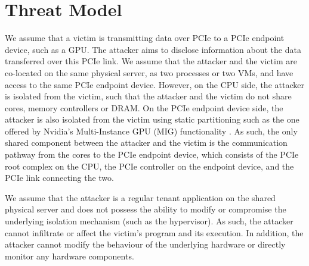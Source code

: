 \section{Threat Model}
\label{sec:interconnect-sc-threat-model}

We assume that a victim is transmitting data over PCIe to a PCIe endpoint device, such as a GPU.
The attacker aims to disclose information about the data transferred over this PCIe link.
We assume that the attacker and the victim are co-located on the same physical server, as two processes or two VMs, and have access to the same PCIe endpoint device.
However, on the CPU side, the attacker is isolated from the victim, such that the attacker and the victim do not share cores, memory controllers or DRAM.
On the PCIe endpoint device side, the attacker is also isolated from the victim using static partitioning such as the one offered by Nvidia's Multi-Instance GPU (MIG) functionality \cite{nvidia_mig_guide}.
As such, the only shared component between the attacker and the victim is the communication pathway from the cores to the PCIe endpoint device, which consists of the PCIe root complex on the CPU, the PCIe controller on the endpoint device, and the PCIe link connecting the two.

We assume that the attacker is a regular tenant application on the shared physical server and does not possess the ability to modify or compromise the underlying isolation mechanism (such as the hypervisor).
As such, the attacker cannot infiltrate or affect the victim's program and its execution.
In addition, the attacker cannot modify the behaviour of the underlying hardware or directly monitor any hardware components.
